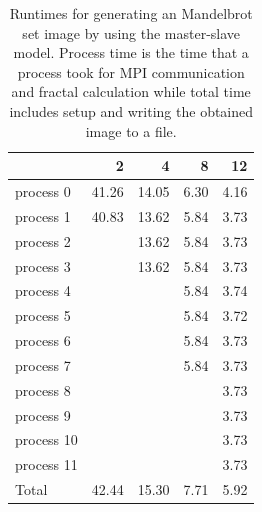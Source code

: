 \documentclass[a4paper]{article}
\begin{document}
\begin{table}[h]
	\centering
	\caption{Runtimes for generating an Mandelbrot set image by using the master-slave model. Process time is the time that a process took for MPI communication and fractal calculation while total time includes setup and writing the obtained image to a file.}
	\label{tbl:mandelbrot2}
	\begin{tabular}{l|r|r|r|r}
		 & 2 & 4 & 8 & 12 \\ \hline
		process 0  & 41.26 & 14.05 & 6.30 & 4.16 \\
		process 1  & 40.83 & 13.62 & 5.84 & 3.73 \\
		process 2  &       & 13.62 & 5.84 & 3.73 \\
		process 3  &       & 13.62 & 5.84 & 3.73 \\
		process 4  &       &       & 5.84 & 3.74 \\
		process 5  &       &       & 5.84 & 3.72 \\
		process 6  &       &       & 5.84 & 3.73 \\
		process 7  &       &       & 5.84 & 3.73 \\
		process 8  &       &       &      & 3.73 \\
		process 9  &       &       &      & 3.73 \\
		process 10 &       &       &      & 3.73 \\
		process 11 &       &       &      & 3.73 \\ \hline
		Total      & 42.44 & 15.30 & 7.71 & 5.92
	\end{tabular}
\end{table}
\end{document}
